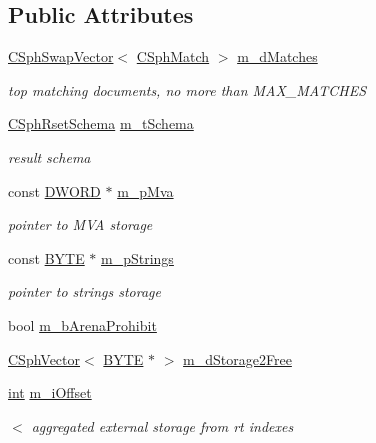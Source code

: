 \subsection*{Public Attributes}
\begin{DoxyCompactItemize}
\item 
\hyperlink{classCSphSwapVector}{C\-Sph\-Swap\-Vector}$<$ \hyperlink{classCSphMatch}{C\-Sph\-Match} $>$ \hyperlink{classCSphQueryResult_a175999928dcd3d04f22d1096f7e8c2c3}{m\-\_\-d\-Matches}
\begin{DoxyCompactList}\small\item\em top matching documents, no more than M\-A\-X\-\_\-\-M\-A\-T\-C\-H\-E\-S \end{DoxyCompactList}\item 
\hyperlink{classCSphRsetSchema}{C\-Sph\-Rset\-Schema} \hyperlink{classCSphQueryResult_abc7d673f1775f6e34f2dd1fb1d65e97b}{m\-\_\-t\-Schema}
\begin{DoxyCompactList}\small\item\em result schema \end{DoxyCompactList}\item 
const \hyperlink{sphinxstd_8h_a798af1e30bc65f319c1a246cecf59e39}{D\-W\-O\-R\-D} $\ast$ \hyperlink{classCSphQueryResult_aba6a0fd625b2379cebed04c18bf13d22}{m\-\_\-p\-Mva}
\begin{DoxyCompactList}\small\item\em pointer to M\-V\-A storage \end{DoxyCompactList}\item 
const \hyperlink{sphinxstd_8h_a4ae1dab0fb4b072a66584546209e7d58}{B\-Y\-T\-E} $\ast$ \hyperlink{classCSphQueryResult_a13597176881ff26764c4dc5e1a0af864}{m\-\_\-p\-Strings}
\begin{DoxyCompactList}\small\item\em pointer to strings storage \end{DoxyCompactList}\item 
bool \hyperlink{classCSphQueryResult_a01a221dd0e015c432f1e0646dbae6ecc}{m\-\_\-b\-Arena\-Prohibit}
\item 
\hyperlink{classCSphVector}{C\-Sph\-Vector}$<$ \hyperlink{sphinxstd_8h_a4ae1dab0fb4b072a66584546209e7d58}{B\-Y\-T\-E} $\ast$ $>$ \hyperlink{classCSphQueryResult_aa314b61046cb6d31ef7f144e87672b7e}{m\-\_\-d\-Storage2\-Free}
\item 
\hyperlink{sphinxexpr_8cpp_a4a26e8f9cb8b736e0c4cbf4d16de985e}{int} \hyperlink{classCSphQueryResult_ae6d9b89727716e85238f0eb6fab19ab0}{m\-\_\-i\-Offset}
\begin{DoxyCompactList}\small\item\em $<$ aggregated external storage from rt indexes \end{DoxyCompactList}\item 

\end{DoxyCompactItemize}
